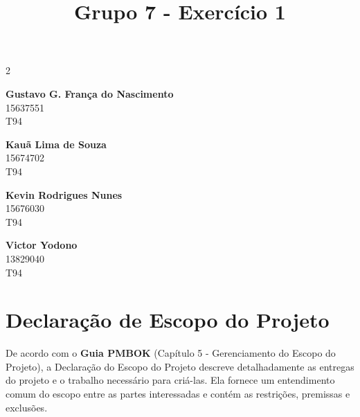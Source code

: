 \documentclass[a4paper]{article}
\title{
    \textbf{Grupo 7 - Exercício 1}
}
\date{}
\begin{document}
\maketitle
\vspace{-1.5cm}
\thispagestyle{firstpage}


\begin{multicols}{2}
    \centering

    \textbf{Gustavo G. França do Nascimento}\\
    15637551\\
    T94
    
    \vspace{0.5cm}
    
    \textbf{Kauã Lima de Souza}\\
    15674702\\
    T94
    
    \vspace{0.5cm}

    \textbf{Kevin Rodrigues Nunes}\\
    15676030\\
    T94
    
    \vspace{0.5cm}
    
    \textbf{Victor Yodono}\\
    13829040\\
    T94

\end{multicols}

\vspace{-0.2cm} %


\singlespacing
\setlength{\parskip}{6pt}
\setlength{\parindent}{0.5cm}

\section{Declaração de Escopo do Projeto}

De acordo com o \textbf{Guia PMBOK} (Capítulo 5 - Gerenciamento do Escopo do Projeto), a Declaração do Escopo do Projeto descreve detalhadamente as entregas do projeto e o trabalho necessário para criá-las. Ela fornece um entendimento comum do escopo entre as partes interessadas e contém as restrições, premissas e exclusões.
\end{document}
